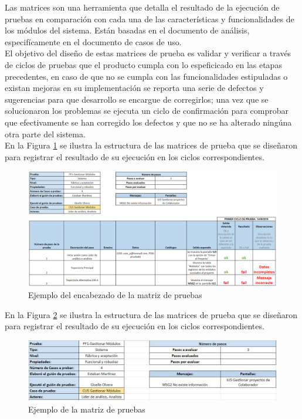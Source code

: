 Las matrices son una herramienta que detalla el resultado de la ejecución de pruebas en comparación con cada una de las características y funcionalidades de los módulos del sistema. Están basadas en el documento de análisis, especifícamente en el documento de casos de uso.\\

El objetivo del diseño de estas matrices de prueba es validar y verificar a través de ciclos de pruebas que el producto cumpla con lo espeficicado en las etapas precedentes, en caso de que no se cumpla con las funcionalidades estipuladas o existan mejoras en su implementación se reporta una serie de defectos y sugerencias para que desarrollo se encargue de corregirlos; una vez que se solucionaron los problemas se ejecuta un ciclo de confirmación para comprobar que efectivamente se han corregido los defectos y que no se ha alterado ningúna otra parte del sistema.\\

En la Figura \ref{fig:estructurap} se ilustra la estructura de las matrices de prueba que se diseñaron para registrar el resultado de su ejecución en los ciclos correspondientes.

\begin{figure}[H]
	\begin{center}
		\includegraphics[width=.99\textwidth]{images/pruebas/diseno/estructurap}
		\caption{Ejemplo del encabezado de la matriz de pruebas}
		\label{fig:estructurap}
	\end{center}
\end{figure}

En la Figura \ref{fig:encabezado} se ilustra la estructura de las matrices de prueba que se diseñaron para registrar el resultado de su ejecución en los ciclos correspondientes.

\begin{figure}[H]
	\begin{center}
		\includegraphics[width=.95\textwidth]{images/pruebas/diseno/encabezado}
		\caption{Ejemplo de la matriz de pruebas}
		\label{fig:encabezado}
	\end{center}
\end{figure}

